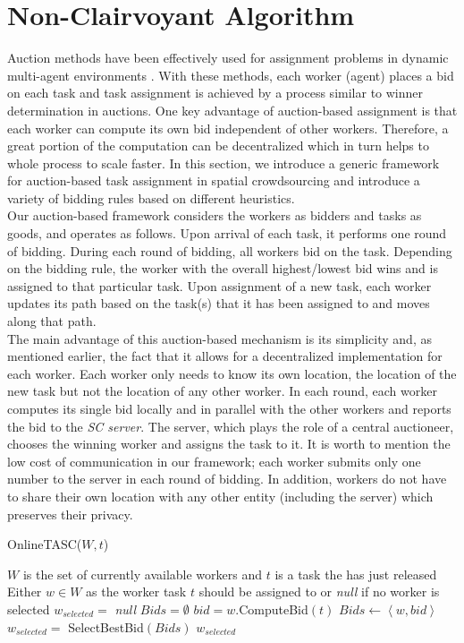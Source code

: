 \section{Non-Clairvoyant Algorithm}

Auction methods have been effectively used for assignment problems in dynamic multi-agent environments \cite{Mehta05,Lagoudakis04}. With these methods, each worker (agent) places a bid on each task and task assignment is achieved by a process similar to winner determination in auctions. One key advantage of auction-based assignment is that each worker can compute its own bid independent of other workers. Therefore, a great portion of the computation can be decentralized which in turn helps to whole process to scale faster. In this section, we introduce a generic framework for auction-based task assignment in spatial crowdsourcing and introduce a variety of bidding rules based on different heuristics.\\

Our auction-based framework considers the workers as bidders and tasks as goods, and operates as follows. Upon arrival of each task, it performs one round of bidding. During each round of bidding, all workers bid on the task. Depending on the bidding rule, the worker with the overall highest/lowest bid wins and is assigned to that particular task. Upon assignment of a new task, each worker updates its path based on the task(s) that it has been assigned to and moves along that path.\\

The main advantage of this auction-based mechanism is its simplicity and, as mentioned earlier, the fact that it allows for a decentralized implementation for each worker. Each worker only needs to know its own location, the location of the new task but not the location of any other worker. In each round, each worker computes its single bid locally and in parallel with the other workers and reports the bid to the \textit{SC server}. The server, which plays the role of a central auctioneer, chooses the winning worker and assigns the task to it. It is worth to mention the low cost of communication in our framework; each worker submits only one number to the server in each round of bidding. In addition, workers do not have to share their own location with any other entity (including the server) which preserves their privacy.\\

\begin{algorithm}
\caption{OnlineTASC($W, t$)}
\label{algo:OnlineTASC}
\begin{algorithmic}[1]
\REQUIRE $W$ is the set of currently available workers and $t$ is a task the has just released
\ENSURE Either $w \in W$ as the worker task $t$ should be assigned to or \emph{null} if no worker is selected
\STATE $w_{selected} = $ \emph{null}
\STATE $Bids = \emptyset$
	\STATE $bid = w$.ComputeBid$(t)$
	\STATE $Bids \leftarrow \left\langle w, bid \right\rangle$
\ENDFOR
\STATE $w_{selected} = $ SelectBestBid$(Bids)$
\RETURN $w_{selected}$
\end{algorithmic}
\end{algorithm}


